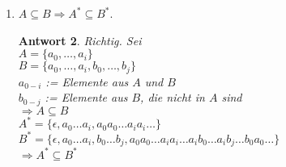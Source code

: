 \documentclass[a4paper,twoside,12pt,fleqn]{article}
\newtheorem*{antwort}{Antwort}
\begin{document}
\begin{description}
\begin{enumerate}
\begin{antwort}
      Richtig:\\
      \begin{align*}
        A^* &= \bigcup^n_{k=0} A^k = A^0 \cup \dots \cup A^n\\
        (A^*)^* &= \{\epsilon\} \cup (A^0\cup\dots\cup A^n) \cup
          (A^0\cup\dots\cup A^n)^2 \cup \dots \cup (A^0\cup\dots\cup A^n)^m\\
          &= \{\epsilon\} \cup A^0 \cup \dots \cup A^n
      \end{align*}
    \end{antwort}
  \item $A \subseteq B \Rightarrow A^* \subseteq B^*$.
    \begin{antwort}
      Richtig. Sei\\
      $A = \{a_0, \dots, a_i\}$\\
      $B = \{a_0, \dots, a_i, b_0, \dots, b_j\}$\\
      $a_{0-i}$ := Elemente aus $A$ und $B$\\
      $b_{0-j}$ := Elemente aus $B$, die nicht in $A$ sind\\
      $\Rightarrow A \subseteq B$\\
      $A^* = \{\epsilon, a_0 \dots a_i, a_0a_0 \dots a_ia_i \dots\}$\\
      $B^* = \{\epsilon, a_0 \dots a_i, b_0 \dots b_j,
        a_0a_0 \dots a_ia_i \dots a_ib_0 \dots a_ib_j
        \dots b_0a_0 \dots\}$\\
      $\Rightarrow A^* \subseteq B^*$
    \end{antwort}
\end{enumerate}
\end{description}
\end{document}
